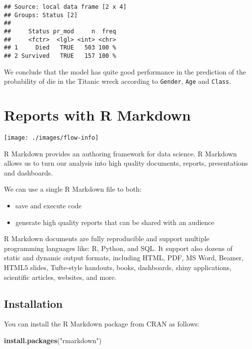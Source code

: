 \documentclass[]{book}
\newenvironment{Shaded}{\begin{snugshade}}{\end{snugshade}}
\newcommand{\KeywordTok}[1]{\textcolor[rgb]{0.13,0.29,0.53}{\textbf{{#1}}}}
\newcommand{\StringTok}[1]{\textcolor[rgb]{0.31,0.60,0.02}{{#1}}}
\newcommand{\NormalTok}[1]{{#1}}
\providecommand{\tightlist}{%
  \setlength{\itemsep}{0pt}\setlength{\parskip}{0pt}}
\def\tightlist{}
\begin{document}
\begin{verbatim}
## Source: local data frame [2 x 4]
## Groups: Status [2]
## 
##     Status pr_mod     n  freq
##     <fctr>  <lgl> <int> <chr>
## 1     Died   TRUE   503 100 %
## 2 Survived   TRUE   157 100 %
\end{verbatim}

We conclude that the model has quite good performance in the prediction
of the probability of die in the Titanic wreck according to
\texttt{Gender}, \texttt{Age} and \texttt{Class}.

\chapter{Reports with R Markdown}\label{reports-with-r-markdown}

\texttt{[image: ./images/flow-info]}

R Markdown provides an authoring framework for data science. R Markdown
allows us to turn our analysis into high quality documents, reports,
presentations and dashboards.

\clearpage

We can use a single R Markdown file to both:

\begin{itemize}
\tightlist
\item
  save and execute code
\item
  generate high quality reports that can be shared with an audience
\end{itemize}

R Markdown documents are fully reproducible and support multiple
programming languages like: R, Python, and SQL. It support also dozens
of static and dynamic output formats, including HTML, PDF, MS Word,
Beamer, HTML5 slides, Tufte-style handouts, books, dashboards, shiny
applications, scientific articles, websites, and more.

\section{Installation}\label{installation}

You can install the R Markdown package from CRAN as follows:

\begin{Shaded}
\begin{Highlighting}[]
\KeywordTok{install.packages}\NormalTok{(}\StringTok{"rmarkdown"}\NormalTok{)}
\end{Highlighting}
\end{Shaded}
\end{document}
